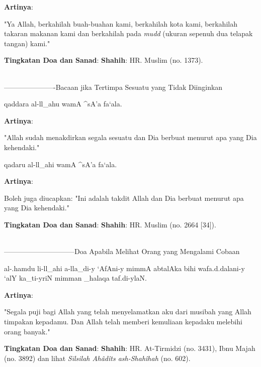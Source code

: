 \documentclass[a4paper,12pt]{article}
\begin{document}
\noindent
\textbf{Artinya}:
\par
\indent
"Ya Allah, berkahilah buah-buahan kami, berkahilah kota kami, berkahilah 
takaran makanan kami dan berkahilah pada \textit{mudd} (ukuran sepenuh dua 
telapak tangan) kami."\\
\par
\noindent
\textbf{Tingkatan Doa dan Sanad}: \textbf{Shahih}: HR. Muslim (no. 1373).\\\\
\par
{}----------------------Bacaan jika Tertimpa Sesuatu yang Tidak Diinginkan
\begin{arabtext}
\noindent
qaddara al-ll_ahu wamA ^sA'a fa`ala.\\
\end{arabtext}
\noindent
\textbf{Artinya}:
\par
\indent
"Allah sudah menakdirkan segala sesuatu dan Dia berbuat menurut apa yang 
Dia kehendaki."\\
\begin{arabtext}
\noindent
qadaru al-ll_ahi wamA ^sA'a fa`ala.\\
\end{arabtext}
\noindent
\textbf{Artinya}:
\par
\indent
Boleh juga diucapkan: "Ini adalah takdit Allah dan Dia berbuat menurut apa 
yang Dia kehendaki."\\
\par
\noindent
\textbf{Tingkatan Doa dan Sanad}: \textbf{Shahih}: HR. Muslim (no. 2664 
[34]).\\\\
\par
{}------------------------------Doa Apabila Melihat Orang yang Mengalami Cobaan
\begin{arabtext}
\noindent
al-.hamdu li-ll_ahi a-lla_di-y `AfAni-y mimmA abtalAka bihi wafa.d.dalani-y 
`alY ka_ti-yriN mimman _halaqa taf.di-ylaN.\\
\end{arabtext}
\noindent
\textbf{Artinya}:
\par
\indent
"Segala puji bagi Allah yang telah menyelamatkan aku dari musibah yang 
Allah timpakan kepadamu. Dan Allah telah memberi kemuliaan kepadaku 
melebihi orang banyak."\\
\par
\noindent
\textbf{Tingkatan Doa dan Sanad}: \textbf{Shahih}: HR. At-Tirmidzi (no. 
3431), Ibnu Majah (no. 3892) dan lihat \textit{Silsilah Ah\^{a}d\^{i}ts 
ash-Shah\^{i}hah} (no. 602). \\\\
\end{document}
